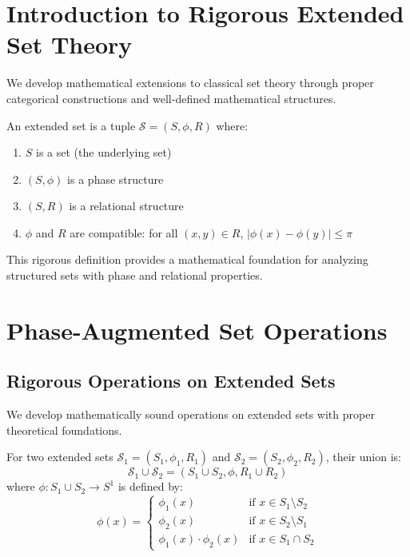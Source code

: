 \section{Introduction to Rigorous Extended Set Theory}

We develop mathematical extensions to classical set theory through proper categorical constructions and well-defined mathematical structures.

\begin{definition}
\label{def:extended_set}
An extended set is a tuple $\mathcal{S} = (S, \phi, R)$ where:
\begin{enumerate}
\item $S$ is a set (the underlying set)
\item $(S, \phi)$ is a phase structure
\item $(S, R)$ is a relational structure
\item $\phi$ and $R$ are compatible: for all $(x,y) \in R$, $|\phi(x) - \phi(y)| \leq \pi$
\end{enumerate}
\end{definition}

This rigorous definition provides a mathematical foundation for analyzing structured sets with phase and relational properties.

\section{Phase-Augmented Set Operations}

\subsection{Rigorous Operations on Extended Sets}

We develop mathematically sound operations on extended sets with proper theoretical foundations.

\begin{definition}
\label{def:extended_union}
For two extended sets $\mathcal{S}_1 = (S_1, \phi_1, R_1)$ and $\mathcal{S}_2 = (S_2, \phi_2, R_2)$, their union is:
$$\mathcal{S}_1 \cup \mathcal{S}_2 = (S_1 \cup S_2, \phi, R_1 \cup R_2)$$
where $\phi: S_1 \cup S_2 \to S^1$ is defined by:
\begin{equation}
\phi(x) = \begin{cases}
\phi_1(x) & \text{if } x \in S_1 \setminus S_2 \\
\phi_2(x) & \text{if } x \in S_2 \setminus S_1 \\
\phi_1(x) \cdot \phi_2(x) & \text{if } x \in S_1 \cap S_2
\end{cases}
\end{equation}
\end{definition}

